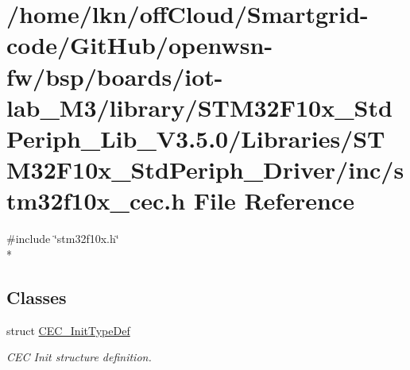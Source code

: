 \hypertarget{iot-lab___m3_2library_2_s_t_m32_f10x___std_periph___lib___v3_85_80_2_libraries_2_s_t_m32_f10x___324ecab3c01f3ebce98995423387ad8e}{}\section{/home/lkn/off\+Cloud/\+Smartgrid-\/code/\+Git\+Hub/openwsn-\/fw/bsp/boards/iot-\/lab\+\_\+\+M3/library/\+S\+T\+M32\+F10x\+\_\+\+Std\+Periph\+\_\+\+Lib\+\_\+\+V3.5.0/\+Libraries/\+S\+T\+M32\+F10x\+\_\+\+Std\+Periph\+\_\+\+Driver/inc/stm32f10x\+\_\+cec.h File Reference}
\label{iot-lab___m3_2library_2_s_t_m32_f10x___std_periph___lib___v3_85_80_2_libraries_2_s_t_m32_f10x___324ecab3c01f3ebce98995423387ad8e}
{\ttfamily \#include \char`\"{}stm32f10x.\+h\char`\"{}}\\*
\subsection*{Classes}
\begin{DoxyCompactItemize}
\item 
struct \hyperlink{struct_c_e_c___init_type_def}{C\+E\+C\+\_\+\+Init\+Type\+Def}
\begin{DoxyCompactList}\small\item\em C\+EC Init structure definition. \end{DoxyCompactList}\end{DoxyCompactItemize}
